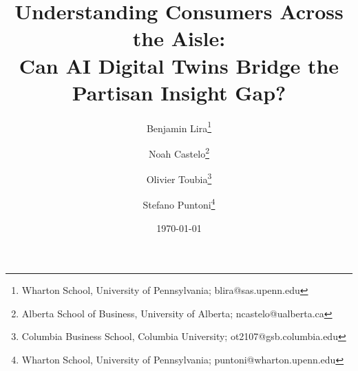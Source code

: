 \usepackage{tabularray}
\usepackage{siunitx}

\usepackage[utf8]{inputenc}
\usepackage[T1]{fontenc}
\usepackage{lmodern}

\usepackage[margin=1in]{geometry}
\usepackage{setspace}
\usepackage{enumerate}
\setlength{\parskip}{.5em}      %
\usepackage{indentfirst}  %
\onehalfspacing

\usepackage{amsmath, amssymb, amsthm}
\usepackage{graphicx}
\usepackage{caption}
\usepackage{subcaption}
\usepackage{comment} 

\makeatletter
\providecommand\absfont{\small}
\makeatother

\usepackage[colorlinks=true, linkcolor=blue, urlcolor=blue, citecolor=blue]{hyperref}

\usepackage{xcolor}
\newcommand{\red}[1]{\textcolor{red}{#1}}

\title{Understanding Consumers Across the Aisle: \\
Can AI Digital Twins Bridge the Partisan Insight Gap?}

\author{
  Benjamin Lira\thanks{Wharton School, University of Pennsylvania; blira@sas.upenn.edu} \and
  Noah Castelo\thanks{Alberta School of Business, University of Alberta; ncastelo@ualberta.ca} \and
  Olivier Toubia\thanks{Columbia Business School, Columbia University; ot2107@gsb.columbia.edu} \and
  Stefano Puntoni\thanks{Wharton School, University of Pennsylvania; puntoni@wharton.upenn.edu}
}

\date{\today}
